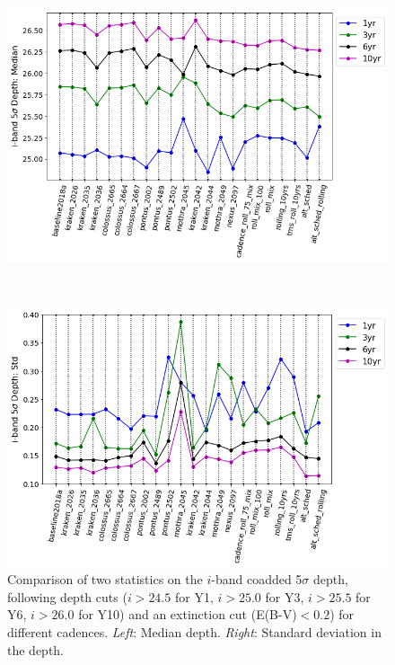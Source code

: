 \begin{figure}[H]
	\vspace*{2em}
	\begin{minipage}{.4\paperwidth}
		\includegraphics[width=.42\paperwidth, trim={5 20 100 10},clip=true]{figures/lss_compare_depth_median_22dbs.png}
	\end{minipage}\
	\hspace*{1em}
	\begin{minipage}{.4\paperwidth}
		\includegraphics[width=.42\paperwidth, trim={5 20 80 10},clip=false]{figures/lss_compare_depth_std_22dbs.png}
	\end{minipage}
	\vspace*{1em}
	\caption{Comparison of two statistics on the $i$-band coadded 5$\sigma$ depth, following depth cuts ($i>24.5$ for Y1, $i>25.0$ for Y3, $i>25.5$ for Y6, $i>26.0$ for Y10) and an extinction cut (E(B-V)$<0.2$) for different cadences. \textit{Left}: Median depth. \textit{Right}: Standard deviation in the depth.}
\label{fig: compare_depth}
\end{figure}


